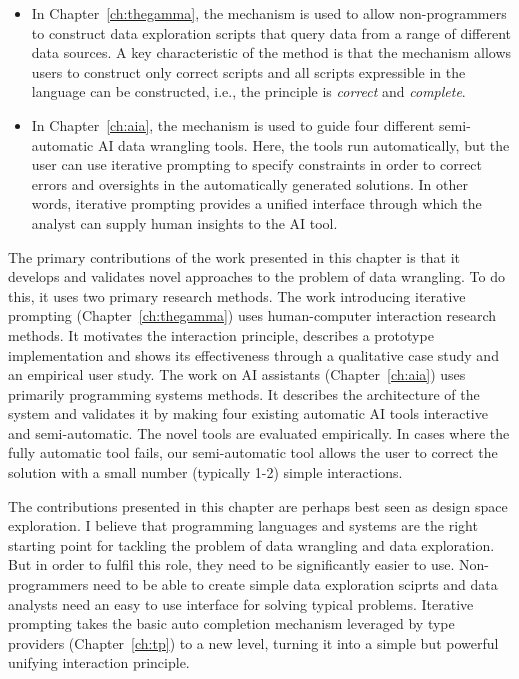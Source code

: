 \documentclass[fleqn,11pt]{report}
\theoremstyle{definition}
\begin{document}
\begin{itemize}
\item In Chapter~\ref{ch:thegamma}, the mechanism is used to allow non-programmers to construct
  data exploration scripts that query data from a range of different data sources. A key
  characteristic of the method is that the mechanism allows users to construct only correct
  scripts and all scripts expressible in the language can be constructed, i.e., the principle
  is \emph{correct} and \emph{complete}.

\item In Chapter~\ref{ch:aia}, the mechanism is used to guide four different semi-automatic AI data
  wrangling tools. Here, the tools run automatically, but the user can use iterative prompting
  to specify constraints in order to correct errors and oversights in the automatically
  generated solutions. In other words, iterative prompting provides a unified interface through
  which the analyst can supply human insights to the AI tool.
\end{itemize}

The primary contributions of the work presented in this chapter is that it develops and validates
novel approaches to the problem of data wrangling. To do this, it uses two primary research
methods. The work introducing iterative prompting (Chapter~\ref{ch:thegamma}) uses human-computer
interaction research methods. It motivates the interaction principle, describes a prototype
implementation and shows its effectiveness through a qualitative case study and an empirical user
study. The work on AI assistants (Chapter~\ref{ch:aia}) uses primarily programming systems methods.
It describes the architecture of the system and validates it by making four existing automatic
AI tools interactive and semi-automatic. The novel tools are evaluated empirically. In cases where
the fully automatic tool fails, our semi-automatic tool allows the user to correct the solution
with a small number (typically 1-2) simple interactions.

The contributions presented in this chapter are perhaps best seen as design space exploration.
I believe that programming languages and systems are the right starting point for tackling the
problem of data wrangling and data exploration. But in order to fulfil this role, they need to
be significantly easier to use. Non-programmers need to be able to create simple data exploration
sciprts and data analysts need an easy to use interface for solving typical problems.
Iterative prompting takes the basic auto completion mechanism leveraged by type providers
(Chapter~\ref{ch:tp}) to a new level, turning it into a simple but powerful unifying
interaction principle.
\end{document}
